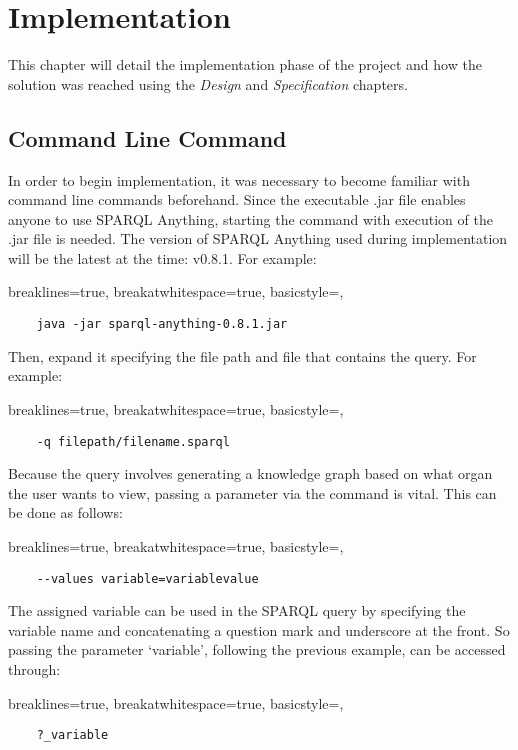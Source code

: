  \chapter{Implementation}
This chapter will detail the implementation phase of the project and how the solution was reached using the \textit{Design} and \textit{Specification} chapters. 

\section{Command Line Command}
\hspace*{0.5cm} In order to begin implementation, it was necessary to become familiar with command line commands beforehand. Since the executable .jar file enables anyone to use SPARQL Anything, starting the command with execution of the .jar file is needed. The version of SPARQL Anything used during implementation will be the latest at the time: v0.8.1. For example:

\lstset
{
    breaklines=true,
    breakatwhitespace=true,
    basicstyle=\linespread{1.5}\ttfamily,
}
\begin{lstlisting}
    java -jar sparql-anything-0.8.1.jar 
\end{lstlisting}

\noindent Then, expand it specifying the file path and file that contains the query. For example:

\lstset
{
    breaklines=true,
    breakatwhitespace=true,
    basicstyle=\linespread{1.5}\ttfamily,
}
\begin{lstlisting}
    -q filepath/filename.sparql
\end{lstlisting}

\noindent Because the query involves generating a knowledge graph based on what organ the user wants to view, passing a parameter via the command is vital. This can be done as follows:

\lstset
{
    breaklines=true,
    breakatwhitespace=true,
    basicstyle=\linespread{1.5}\ttfamily,
}
\begin{lstlisting}
    --values variable=variablevalue
\end{lstlisting}

\noindent The assigned variable can be used in the SPARQL query by specifying the variable name and concatenating a question mark and underscore at the front. So passing the parameter `variable', following the previous example, can be accessed through:

\lstset
{
    breaklines=true,
    breakatwhitespace=true,
    basicstyle=\linespread{1.5}\ttfamily,
}
\begin{lstlisting}
    ?_variable
\end{lstlisting}

